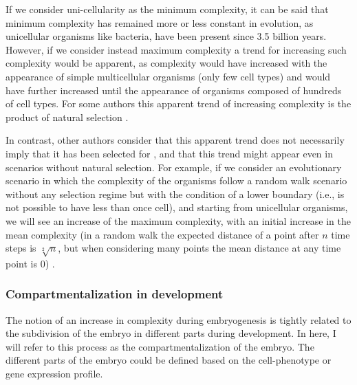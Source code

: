 If we consider uni-cellularity as the minimum complexity, it can be said that minimum complexity has remained more or less constant in evolution, as unicellular organisms like bacteria, have been present since 3.5 billion years. However, if we consider instead maximum complexity a trend for increasing such complexity would be apparent, as complexity would have increased with the appearance of simple multicellular organisms (only few cell types) and would have further increased until the appearance of organisms composed of hundreds of cell types. For some authors this apparent trend of increasing complexity is the product of natural selection \citep{bonner1988evolution,Carroll2001}.

In contrast, other authors consider that this apparent trend does not necessarily imply that it has been selected for \citep{McShea2015}, and that this trend might appear even in scenarios without natural selection. 
For example, if we consider an evolutionary scenario in which the complexity of the organisms follow a random walk scenario without any selection regime but with the condition of a lower boundary (i.e., is not possible to have less than once cell), and starting from unicellular organisms, we will see an increase of the maximum complexity, with an initial increase in the mean complexity (in a random walk the expected distance of a point after $n$ time steps is $\sqrt[2]{n}$, but when considering many points the mean distance at any time point is 0) \citep{gould1996fullhouse}.

\subsubsection{Compartmentalization in development}

The notion of an increase in complexity during embryogenesis is tightly related to the subdivision of the embryo in different parts during development. 
In here, I will refer to this process as the compartmentalization of the embryo. 
The different parts of the embryo could be defined based on the cell-phenotype or gene expression profile.

